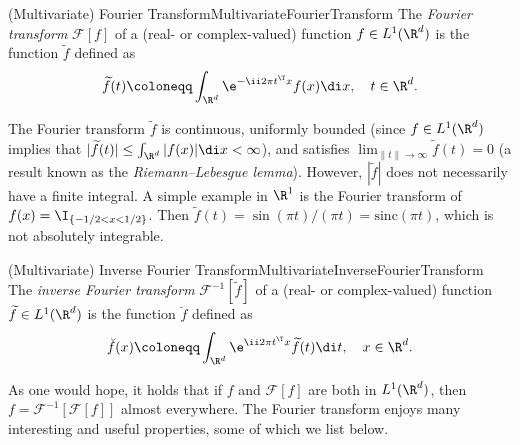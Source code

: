 \begin{defn}{(Multivariate) Fourier Transform}{MultivariateFourierTransform}
	The \textit{Fourier transform} $\mathcal{F}[f]$ of a (real- or complex-valued) function $f \in L^1(\R^d)$ is the function $\widetilde{f}$ defined as
	\begin{equation*}
		\widetilde{f}(t) \coloneqq \int_{\R^d} \e^{-\ii 2\pi t^\T x} f(x) \di x, \quad t \in \R^d.
	\end{equation*}
\end{defn}

The Fourier transform $\widetilde{f}$ is continuous, uniformly bounded (since $f \in L^1(\R^d)$ implies that $|\widetilde{f}(t)| \le \int_{\R^d} |f(x)| \di x < \infty$), and satisfies $\lim_{\|t\| \to \infty} \widetilde{f}(t) = 0$ (a result known as the \textit{Riemann--Lebesgue lemma}). However, $|\widetilde{f}|$ does not necessarily have a finite integral. A simple example in $\R^1$ is the Fourier transform of $f(x) = \I_{\{-1/2 < x < 1/2\}}$. Then $\widetilde{f}(t) = \sin(\pi t)/(\pi t) = \mathrm{sinc}(\pi t)$, which is not absolutely integrable.

\begin{defn}{(Multivariate) Inverse Fourier Transform}{MultivariateInverseFourierTransform}
	The \textit{inverse Fourier transform} $\mathcal{F}^{-1}[\widetilde{f}]$ of a (real- or complex-valued) function $\widetilde{f} \in L^1(\R^d)$ is the function $\breve{f}$ defined as
	\begin{equation*}
		\breve{f}(x) \coloneqq \int_{\R^d} \e^{\ii 2\pi t^\T x} \widetilde{f}(t) \di t, \quad x \in \R^d.
	\end{equation*}
\end{defn}

As one would hope, it holds that if $f$ and $\mathcal{F}[f]$ are both in $L^1(\R^d)$, then $f = \mathcal{F}^{-1}[\mathcal{F}[f]]$ almost everywhere.
The Fourier transform enjoys many interesting and useful properties, some of which we list below.

